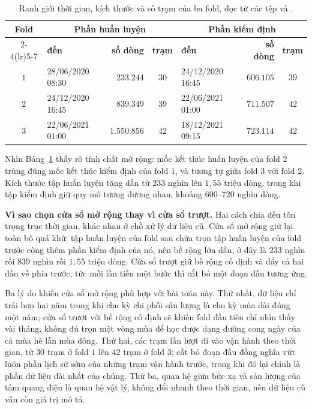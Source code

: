 \begin{table}[htbp]
\centering

\small
\begin{tabular}{c l r c l r c}
\toprule
\textbf{Fold} & \multicolumn{3}{c}{\textbf{Phần huấn luyện}} & \multicolumn{3}{c}{\textbf{Phần kiểm định}} \\
\cmidrule(lr){2-4}\cmidrule(lr){5-7}
 & \textbf{đến} & \textbf{số dòng} & \textbf{trạm} & \textbf{đến} & \textbf{số dòng} & \textbf{trạm} \\
\midrule
$1$ & 28/06/2020 08:30 & $233.244$ & $30$ & 24/12/2020 16:45 & $606.105$ & $39$ \\
$2$ & 24/12/2020 16:45 & $839.349$ & $39$ & 22/06/2021 01:00 & $711.507$ & $42$ \\
$3$ & 22/06/2021 01:00 & $1.550.856$ & $42$ & 18/12/2021 09:15 & $723.114$ & $42$ \\
\bottomrule
\end{tabular}
\caption[Ranh giới thời gian, kích thước và số trạm của ba fold, đọc từ các tệp]{Ranh giới thời gian, kích thước và số trạm của ba fold, đọc từ các tệp
 và .}
\label{tab:ba_fold}
\end{table}

Nhìn Bảng~\ref{tab:ba_fold} thấy rõ tính chất mở rộng: mốc kết thúc huấn luyện của fold
$2$ trùng đúng mốc kết thúc kiểm định của fold $1$, và tương tự giữa fold $3$ với fold
$2$. Kích thước tập huấn luyện tăng dần từ $233$ nghìn lên $1{,}55$ triệu dòng, trong
khi tập kiểm định giữ quy mô tương đương nhau, khoảng $600$--$720$ nghìn dòng.

\textbf{Vì sao chọn cửa sổ mở rộng thay vì cửa sổ trượt.} Hai cách chia đều tôn trọng
trục thời gian, khác nhau ở chỗ xử lý dữ liệu cũ. Cửa sổ mở rộng giữ lại toàn bộ quá khứ:
tập huấn luyện của fold sau chứa trọn tập huấn luyện của fold trước cộng thêm phần kiểm
định của nó, nên bề rộng lớn dần, ở đây là $233$ nghìn rồi $839$ nghìn rồi $1{,}55$ triệu
dòng. Cửa sổ trượt giữ bề rộng cố định và đẩy cả hai đầu về phía trước, tức mỗi lần tiến
một bước thì cắt bỏ một đoạn đầu tương ứng.

Ba lý do khiến cửa sổ mở rộng phù hợp với bài toán này. Thứ nhất, dữ liệu chỉ trải hơn
hai năm trong khi chu kỳ chi phối sản lượng là chu kỳ mùa dài đúng một năm; cửa sổ trượt
với bề rộng cố định sẽ khiến fold đầu tiên chỉ nhìn thấy vài tháng, không đủ trọn một
vòng mùa để học được dạng đường cong ngày của cả mùa hè lẫn mùa đông. Thứ hai, các trạm
lần lượt đi vào vận hành theo thời gian, từ $30$ trạm ở fold $1$ lên $42$ trạm ở fold $3$;
cắt bỏ đoạn đầu đồng nghĩa vứt luôn phần lịch sử sớm của những trạm vận hành trước, trong
khi đó lại chính là phần dữ liệu dài nhất của chúng. Thứ ba, quan hệ giữa bức xạ và sản
lượng của tấm quang điện là quan hệ vật lý, không đổi nhanh theo thời gian, nên dữ liệu
cũ vẫn còn giá trị mô tả.

